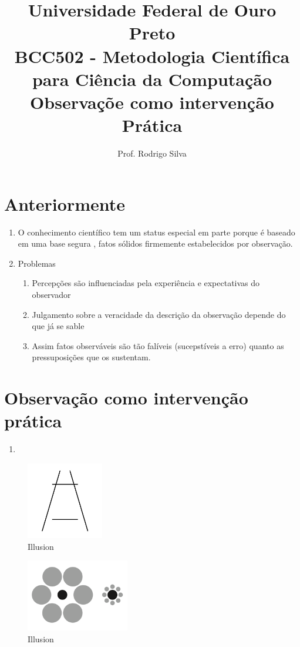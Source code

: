 \documentclass{article}
\title{\vspace{-2 cm}Universidade Federal de Ouro Preto \\ BCC502 - Metodologia Científica para Ciência da Computação \\\textbf{ Observaçõe como intervenção Prática}}
\author{Prof. Rodrigo Silva}
\date{}
\begin{document}
\maketitle

\section{Anteriormente}

\begin{enumerate}
    \item O conhecimento científico tem um status especial em parte porque é baseado em uma base segura , fatos sólidos firmemente estabelecidos por observação.
    \item Problemas
    \begin{enumerate}
        \item Percepções são influenciadas pela experiência e expectativas do observador
        \item Julgamento sobre a veracidade da descrição da observação depende do que já se sable 
        \item Assim fatos observáveis são tão falíveis (sucepstíveis a erro) quanto as pressuposições que os sustentam.    
    \end{enumerate}
\end{enumerate}

\section{Observação como intervenção prática}

\begin{enumerate}
    \item 
\end{enumerate}

\begin{figure}[!htbp]
    \centering
    \includegraphics[width=0.3\textwidth]{Ponzo_Illusion.png}
    \caption{Illusion}
    \label{fig:illusion1}
\end{figure}

\begin{figure}[!htbp]
    \centering
    \includegraphics[width=0.4\textwidth]{ilusao_ebin.png}
    \caption{Illusion}
    \label{fig:illusion2}
\end{figure}
\end{document}
